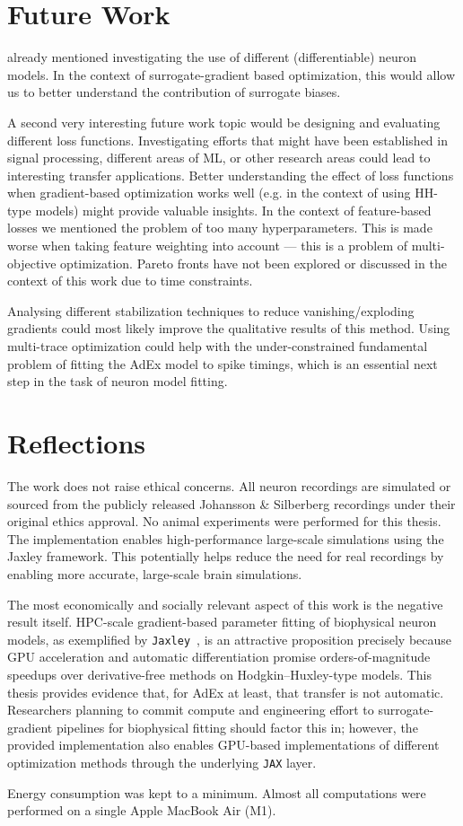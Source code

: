 \section{Future Work}
\label{sec:future-work}

 already mentioned investigating the use of different (differentiable) neuron models.
In the context of surrogate-gradient based optimization, this would allow us to better understand the contribution of surrogate biases.

A second very interesting future work topic would be designing and evaluating different loss functions.
Investigating efforts that might have been established in signal processing, different areas of \gls{ML},
or other research areas could lead to interesting transfer applications.
Better understanding the effect of loss functions when gradient-based optimization works well
(e.g. in the context of using \gls{HH}-type models) might provide valuable insights.
In the context of feature-based losses we mentioned the problem of too many hyperparameters.
This is made worse when taking feature weighting into account --- this is a problem of multi-objective optimization.
Pareto fronts have not been explored or discussed in the context of this work due to time constraints.

Analysing different stabilization techniques to reduce vanishing/exploding gradients could 
most likely improve the qualitative results of this method.
Using multi-trace optimization could help with the under-constrained fundamental problem of fitting the \gls{AdEx}
model to spike timings, which is an essential next step in the task of neuron model fitting.

\section{Reflections}
\label{sec:reflections}

The work does not raise ethical concerns.
All neuron recordings are simulated or sourced from the publicly released Johansson \& Silberberg recordings under their original ethics approval.
No animal experiments were performed for this thesis.
The implementation enables high-performance large-scale simulations using the Jaxley framework.
This potentially helps reduce the need for real recordings by enabling more accurate, large-scale brain simulations.

The most economically and socially relevant aspect of this work is the negative result itself.
\gls{HPC}-scale gradient-based parameter fitting of biophysical neuron models,
as exemplified by \texttt{Jaxley}~\cite{Deistler2025},
is an attractive proposition precisely because GPU acceleration and automatic differentiation promise orders-of-magnitude
speedups over derivative-free methods on Hodgkin--Huxley-type models.
This thesis provides evidence that, for \gls{AdEx} at least, that transfer is not automatic.
Researchers planning to commit compute and engineering effort to surrogate-gradient pipelines for biophysical fitting
should factor this in;
however, the provided implementation also enables GPU-based implementations of different optimization methods
through the underlying \texttt{JAX} layer.

Energy consumption was kept to a minimum.
Almost all computations were performed on a single Apple MacBook Air (M1).
